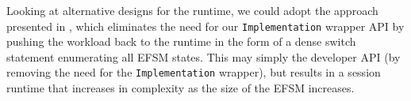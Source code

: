 Looking at alternative designs for the runtime,
we could adopt the approach presented in \cite{TSOP},
which eliminates the need for our \texttt{Implementation} wrapper API
by pushing the workload back to the runtime in the form of a
dense switch statement enumerating all EFSM states.
This may simply the developer API (by removing the need for
the \texttt{Implementation} wrapper), but results in a
session runtime that increases in complexity as the size of the EFSM
increases.